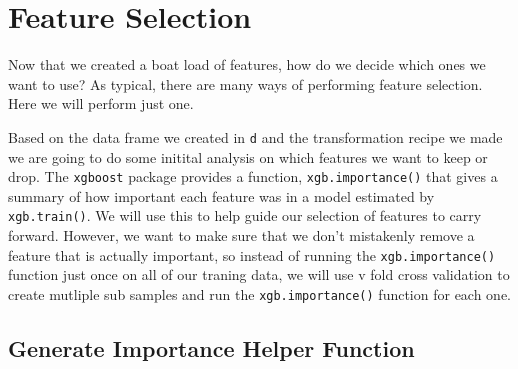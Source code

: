 \documentclass[]{book}
\newenvironment{Shaded}{\begin{snugshade}}{\end{snugshade}}
\newcommand{\KeywordTok}[1]{\textcolor[rgb]{0.13,0.29,0.53}{\textbf{#1}}}
\newcommand{\DataTypeTok}[1]{\textcolor[rgb]{0.13,0.29,0.53}{#1}}
\newcommand{\DecValTok}[1]{\textcolor[rgb]{0.00,0.00,0.81}{#1}}
\newcommand{\StringTok}[1]{\textcolor[rgb]{0.31,0.60,0.02}{#1}}
\newcommand{\ControlFlowTok}[1]{\textcolor[rgb]{0.13,0.29,0.53}{\textbf{#1}}}
\newcommand{\OperatorTok}[1]{\textcolor[rgb]{0.81,0.36,0.00}{\textbf{#1}}}
\newcommand{\NormalTok}[1]{#1}
\theoremstyle{definition}
\theoremstyle{definition}
\theoremstyle{definition}
\theoremstyle{remark}
\begin{document}
\chapter{Feature Selection}\label{feature-selection}

Now that we created a boat load of features, how do we decide which ones
we want to use? As typical, there are many ways of performing feature
selection. Here we will perform just one.

Based on the data frame we created in \texttt{d} and the transformation
recipe we made we are going to do some initital analysis on which
features we want to keep or drop. The \texttt{xgboost} package provides
a function, \texttt{xgb.importance()} that gives a summary of how
important each feature was in a model estimated by \texttt{xgb.train()}.
We will use this to help guide our selection of features to carry
forward. However, we want to make sure that we don't mistakenly remove a
feature that is actually important, so instead of running the
\texttt{xgb.importance()} function just once on all of our traning data,
we will use v fold cross validation to create mutliple sub samples and
run the \texttt{xgb.importance()} function for each one.

\section{Generate Importance Helper
Function}\label{generate-importance-helper-function}

\begin{Shaded}
\end{Shaded}
\end{document}
